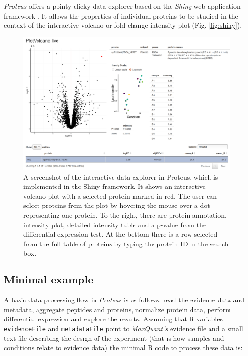 \documentclass[]{article}
\begin{document}
\emph{Proteus} offers a pointy-clicky data explorer based on the
\emph{Shiny} web application framework \citep{shiny}. It allows the
properties of individual proteins to be studied in the context of the
interactive volcano or fold-change-intensity plot (Fig.
\ref{fig:shiny}).

\begin{figure}[H]

{\centering \includegraphics{volcano_live_screenshot} 

}

\caption{\label{fig:shiny}A screenshot of the interactive data explorer in Proteus, which is implemented in the Shiny framework. It shows an interactive volcano plot with a selected protein marked in red. The user can select proteins from the plot by hovering the mouse over a dot representing one protein. To the right, there are protein annotation, intensity plot, detailed intensity table and a p-value from the differential expression test. At the bottom there is a row selected from the full table of proteins by typing the protein ID in the search box.}\label{fig:fig_shiny}
\end{figure}

\subsection{Minimal example}\label{minimal-example}

A basic data processing flow in \emph{Proteus} is as follows: read the
evidence data and metadata, aggregate peptides and proteins, normalize
protein data, perform differential expression and explore the results.
Assuming that R variables \texttt{evidenceFile} and
\texttt{metadataFile} point to \emph{MaxQuant's} evidence file and a
small text file describing the design of the experiment (that is how
samples and conditions relate to evidence data) the minimal R code to
process these data is:
\end{document}
